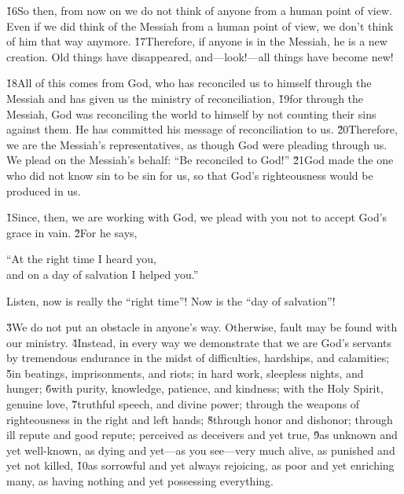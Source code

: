 \v{16}So then, from now on we do not think of anyone from a human point of view. Even if we did think of the Messiah from a human point of view, we don't think of him that way anymore. \v{17}Therefore, if anyone is in the Messiah, he is a new creation. Old things have disappeared, and---look!---all things have become new!

\v{18}All of this comes from God, who has reconciled us to himself through the Messiah and has given us the ministry of reconciliation, \v{19}for through the Messiah, God was reconciling the world to himself by not counting their sins against them. He has committed his message of reconciliation to us. \v{20}Therefore, we are the Messiah's representatives, as though God were pleading through us. We plead on the Messiah's behalf: ``Be reconciled to God!'' \v{21}God made the one who did not know sin to be sin for us, so that God's righteousness would be produced in us.

\v{1}Since, then, we are working with God, we plead with you not to accept God's grace in vain. \v{2}For he says,

\begin{poetry}
\poeml ``At the right time I heard you, \\
\poeml and on a day of salvation I helped you.''
\end{poetry}

Listen, now is really the ``right time''! Now is the ``day of salvation''!

\v{3}We do not put an obstacle in anyone's way. Otherwise, fault may be found with our ministry. \v{4}Instead, in every way we demonstrate that we are God's servants by tremendous endurance in the midst of difficulties, hardships, and calamities; \v{5}in beatings, imprisonments, and riots; in hard work, sleepless nights, and hunger; \v{6}with purity, knowledge, patience, and kindness; with the Holy Spirit, genuine love, \v{7}truthful speech, and divine power; through the weapons of righteousness in the right and left hands; \v{8}through honor and dishonor; through ill repute and good repute; perceived as deceivers and yet true, \v{9}as unknown and yet well-known, as dying and yet---as you see---very much alive, as punished and yet not killed, \v{10}as sorrowful and yet always rejoicing, as poor and yet enriching many, as having nothing and yet possessing everything.

